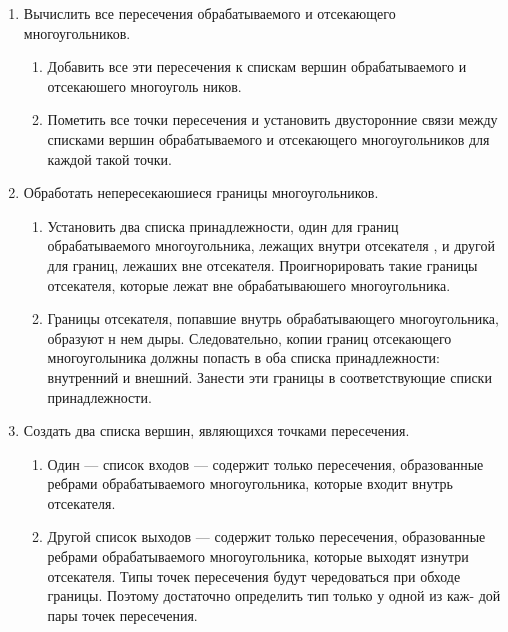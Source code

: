 \documentclass[12pt]{article}
\begin{document}
\begin{enumerate}
\item Вычислить все пересечения обрабатываемого и отсекающего многоугольников.
\begin{enumerate}
\item Добавить все эти пересечения к спискам вершин обрабатываемого и отсекаюшего многоуголь
ников.

\item Пометить все точки пересечения и установить двусторонние связи между списками вершин
обрабатываемого и отсекающего многоугольников для каждой такой точки.






\end{enumerate}






\item   Обработать непересекаюшиеся границы многоугольников.
\begin{enumerate}
\item Установить два списка принадлежности, один для границ обрабатываемого многоугольника, лежащих внутри отсекателя	, и другой для границ, лежаших вне отсекателя. Проигнорировать такие
границы отсекателя, которые лежат вне обрабатываюшего многоугольника.

\item  Границы отсекателя, попавшие внутрь обрабатывающего многоугольника, образуют н нем дыры. Следовательно, копии границ отсекающего многоуголыника должны попасть в оба списка
принадлежности: внутренний и внешний. Занести эти границы в соответствующие списки принадлежности.
\end{enumerate}







\item  Создать два списка вершин, являющихся точками пересечения.
\begin{enumerate}
\item Один — список входов — содержит только пересечения, образованные ребрами обрабатываемого
многоугольника, которые входит внутрь отсекателя.

\item Другой список выходов — содержит только пересечения, образованные ребрами обрабатываемого многоугольника, которые выходят изнутри отсекателя. Типы точек пересечения будут
чередоваться при обходе границы. Поэтому достаточно определить тип только у одной из каж-
дой пары точек пересечения.









\end{enumerate}
\end{enumerate}
\end{document}
